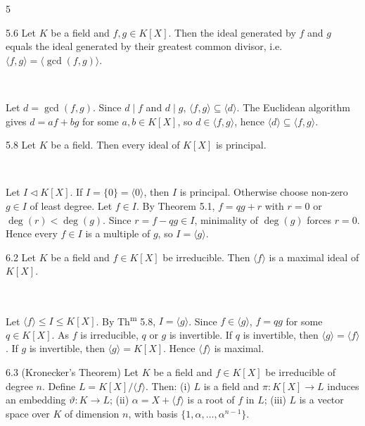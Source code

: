 \documentclass[8pt]{extarticle}
\makeatletter
\renewenvironment{proof}[1][\proofname]{%
  \par\noindent
  \pushQED{\qed}%
  \normalfont\itshape #1\@addpunct{.}\ \normalfont\ignorespaces
}{%
  \popQED%
  \par
}
\makeatother
\begin{document}
\begin{multicols}{5}
        \begin{corollary}{5.6}
            Let \(K\) be a field and \(f,g\in K[X]\). Then the ideal generated by \(f\) and \(g\) equals the ideal generated by their greatest common divisor, i.e. \(\langle f,g\rangle=\langle\gcd(f,g)\rangle\).
        \end{corollary}

        \begin{proof}
            Let \(d=\gcd(f,g)\). Since \(d\mid f\) and \(d\mid g\), \(\langle f,g\rangle\subseteq\langle d\rangle\). The Euclidean algorithm gives \(d=af+bg\) for some \(a,b\in K[X]\), so \(d\in\langle f,g\rangle\), hence \(\langle d\rangle\subseteq\langle f,g\rangle\).
        \end{proof}

        \begin{theorem}{5.8}
            Let \(K\) be a field. Then every ideal of \(K[X]\) is principal.
        \end{theorem}

        \begin{proof}
            Let \(I\lhd K[X]\). If \(I=\{0\}=\langle0\rangle\), then \(I\) is principal. Otherwise choose non-zero \(g\in I\) of least degree. Let \(f\in I\). By Theorem 5.1, \(f=qg+r\) with \(r=0\) or \(\deg(r)<\deg(g)\). Since \(r=f-qg\in I\), minimality of \(\deg(g)\) forces \(r=0\). Hence every \(f\in I\) is a multiple of \(g\), so \(I=\langle g\rangle\).
        \end{proof}

        \begin{lemma}{6.2}
            Let \(K\) be a field and \(f\in K[X]\) be irreducible. Then \(\langle f\rangle\) is a maximal ideal of \(K[X]\).
        \end{lemma}

        \begin{proof}
            Let \(\langle f\rangle\le I\le K[X]\). By Th\textsuperscript{m} 5.8, \(I=\langle g\rangle\). Since \(f\in\langle g\rangle\), \(f=qg\) for some \(q\in K[X]\). As \(f\) is irreducible, \(q\) or \(g\) is invertible. If \(q\) is invertible, then \(\langle g\rangle=\langle f\rangle\). If \(g\) is invertible, then \(\langle g\rangle=K[X]\). Hence \(\langle f\rangle\) is maximal.
        \end{proof}

        \begin{theorem}{6.3}
            (Kronecker's Theorem) Let \(K\) be a field and \(f\in K[X]\) be irreducible of degree \(n\). Define \(L=K[X]/\langle f\rangle\). Then: (i) \(L\) is a field and \(\pi:K[X]\to L\) induces an embedding \(\vartheta:K\to L\); (ii) \(\alpha=X+\langle f\rangle\) is a root of \(f\) in \(L\); (iii) \(L\) is a vector space over \(K\) of dimension \(n\), with basis \(\{1,\alpha,\ldots,\alpha^{n-1}\}\).
        \end{theorem}


\end{multicols}
\end{document}
